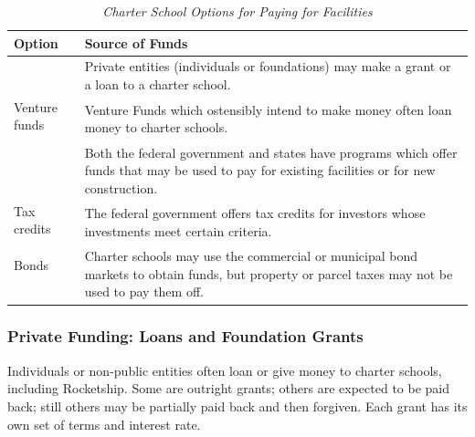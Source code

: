 \begin{table}[ht]
  \caption[Charter School Options for Paying for Facilities]{\textit{Charter School Options for Paying for Facilities}}%
  \label{tab:paying-for-facilities}%
  \begin{tabular}{ll}
    \toprule%
    Option    & Source of Funds \\
    \midrule%
    \protect\medskip%
    \multirow[t]{2}{1.25in}{Private grants or loans} & \multirow[t]{2}{4.25in}{Private entities (individuals or foundations) may make a grant or a loan to  a charter school.}\\\\ %
    \protect\medskip%
    Venture funds & \multirow[t]{2}{4.25in}{Venture Funds which ostensibly intend to make money often loan money to charter schools.}\\\\
    \protect\medskip%
    \multirow[t]{3}{1.25in}{Federal or state grants} & \multirow[t]{3}{4.25in}{Both the federal government and states have programs which offer funds that may be used to pay for existing facilities or for new construction.}\\\\\\
    \protect\medskip%
    Tax credits & \multirow[t]{2}{4.25in}{The federal government offers tax credits for investors whose investments meet
certain criteria.}\\\\
    Bonds & \multirow[t]{3}{4.25in}{Charter schools may use the commercial or municipal bond markets to obtain funds, but property or parcel taxes may not be used to pay them off.}\\\\\\
    \bottomrule%
  \end{tabular}
\end{table}

\subsubsection{Private Funding: Loans and Foundation Grants}\label{sec:private-funding}\indent%

Individuals or non-public entities often loan or give money to charter schools, including Rocketship. Some are outright grants; others are expected to be paid back; still others may be partially paid back and then forgiven. Each grant has its own set of terms and interest rate.


